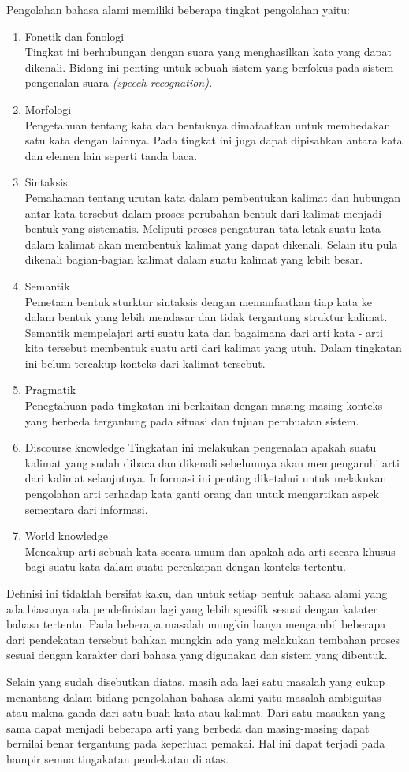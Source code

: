 Pengolahan bahasa alami memiliki beberapa tingkat pengolahan yaitu:
\begin{enumerate}
	\item Fonetik dan fonologi \\
		Tingkat ini berhubungan dengan suara yang menghasilkan kata yang dapat dikenali. Bidang ini penting untuk sebuah sistem yang berfokus pada sistem pengenalan suara \emph{(speech recognation).}
	\item Morfologi \\
		Pengetahuan tentang kata dan bentuknya dimafaatkan untuk membedakan satu kata dengan lainnya. Pada tingkat ini juga dapat dipisahkan antara kata dan elemen lain seperti tanda baca.
	\item Sintaksis \\
		Pemahaman tentang urutan kata dalam pembentukan kalimat dan hubungan antar kata tersebut dalam proses perubahan bentuk dari kalimat menjadi bentuk yang sistematis. Meliputi proses pengaturan tata letak suatu kata dalam kalimat akan membentuk kalimat yang dapat dikenali. Selain itu pula dikenali bagian-bagian kalimat dalam suatu kalimat yang lebih besar.
	\item Semantik\\
		Pemetaan bentuk sturktur sintaksis dengan memanfaatkan tiap kata ke dalam bentuk yang lebih mendasar dan tidak tergantung struktur kalimat. Semantik mempelajari arti suatu kata dan bagaimana dari arti kata - arti kita tersebut membentuk suatu arti dari kalimat yang utuh. Dalam tingkatan ini belum tercakup konteks dari kalimat tersebut.
	\item Pragmatik\\
		Penegtahuan pada tingkatan ini berkaitan dengan masing-masing konteks yang berbeda tergantung pada situasi dan tujuan pembuatan sistem.
	\item Discourse knowledge
		Tingkatan ini melakukan pengenalan apakah suatu kalimat yang sudah dibaca dan dikenali sebelumnya akan mempengaruhi arti dari kalimat selanjutnya. Informasi ini penting diketahui untuk melakukan pengolahan arti terhadap kata ganti orang dan untuk mengartikan aspek sementara dari informasi.
	\item World knowledge\\
		Mencakup arti sebuah kata secara umum dan apakah ada arti secara khusus bagi suatu kata dalam suatu percakapan dengan konteks tertentu.
\end{enumerate}

Definisi ini tidaklah bersifat kaku, dan untuk setiap bentuk bahasa alami yang ada biasanya ada pendefinisian lagi yang lebih spesifik sesuai dengan katater bahasa tertentu. Pada beberapa masalah mungkin hanya mengambil beberapa dari pendekatan tersebut bahkan mungkin ada yang melakukan tembahan proses sesuai dengan karakter dari bahasa yang digunakan dan sistem yang dibentuk.

Selain yang sudah disebutkan diatas, masih ada lagi satu masalah yang cukup menantang dalam bidang pengolahan bahasa alami yaitu masalah ambiguitas atau makna ganda dari satu buah kata atau kalimat. Dari satu masukan yang sama dapat menjadi beberapa arti yang berbeda dan masing-masing dapat bernilai benar tergantung pada keperluan pemakai. Hal ini dapat terjadi pada hampir semua tingakatan pendekatan di atas.